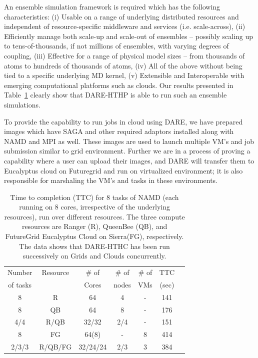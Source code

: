 \documentclass{sig-alternate}
\begin{document}
An ensemble simulation framework is required which has the following
characteristics: (i) Usable on a range of underlying distributed
resources and independent of resource-specific
middleware and services (i.e. scale-across), (ii) Efficiently manage
both scale-up and scale-out of ensembles -- possibly scaling up to
tens-of-thousands, if not millions of ensembles, with varying degrees
of coupling, (iii) Effective for a range of physical model sizes --
from thousands of atoms to hundreds of thousands of atoms, (iv) All of
the above without being tied to a specific underlying MD kernel, (v)
Extensible and Interoperable with emerging computational platforms
such as clouds.  Our results presented in
Table~\ref{table:HTHP-Distributed} clearly show that DARE-HTHP is able
to run such an ensemble simulations.



To provide the capability to run jobs in cloud using DARE, we have
prepared images which have SAGA and other required adaptors installed
along with NAMD and MPI as well.  These images are used to launch
multiple VM's and job submission similar to grid environment. Further
we are in a process of proving a capability where a user can upload
their images, and DARE will transfer them to Eucalyptus cloud on
Futuregrid and run on virtualized environment; it is also responsible
for marshaling the VM's and tasks in these environments.

 \begin{table}
\small
 \begin{tabular}{|c|c|c|c|c|c|c|} 
 \hline 
 Number           & Resource    & \# of &  \# of     &     \# of     &	TTC  \\
of tasks                &     &  Cores    &nodes&   VMs  & (sec) \\  
\hline
8& R&	64	&4 & - &141\\
\hline                  
8& QB	&	64& 8 &	-&176 \\
\hline
4/4&R/QB	&	32/32 &2/4&-&151\\
\hline
8&FG	&	64(8) & - &8&414 \\
\hline
2/3/3&R/QB/FG	&32/24/24&2/3&	3 &384\\
\hline


\end{tabular}
\caption{Time to completion (TTC) for 8 tasks of NAMD (each running on 8 cores,
  irrespective of the underlying resources), run over different resources. The three
  compute resources are Ranger (R), QueenBee (QB), 
  and  FutureGrid  Eucalyptus Cloud on Sierra(FG), respectively. The
  data shows that DARE-HTHC has been run successively on Grids and
  Clouds concurrently.}
 \label{table:HTHP-Distributed} 
\end{table}
\end{document}
